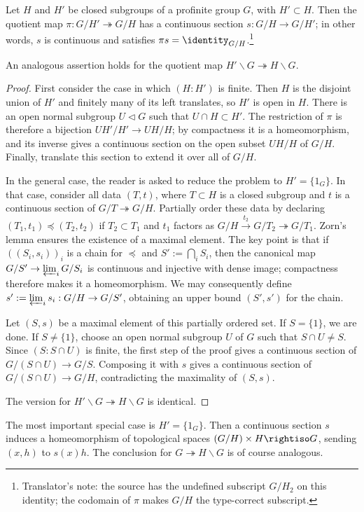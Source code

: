 \begin{lemma}\label{prop:profinite-section}
	Let $H$ and $H'$ be closed subgroups of a profinite group $G$, with $H'\subset H$. Then the quotient map $\pi:G/H'\twoheadrightarrow G/H$ has a continuous section $s:G/H\to G/H'$; in other words, $s$ is continuous and satisfies $\pi s=\identity_{G/H}$.\footnote{Translator's note: the source has the undefined subscript $G/H_2$ on this identity; the codomain of $\pi$ makes $G/H$ the type-correct subscript.}

	An analogous assertion holds for the quotient map
	$H'\backslash G\twoheadrightarrow H\backslash G$.
\end{lemma}
\begin{proof}
	First consider the case in which $(H:H')$ is finite. Then $H$ is the disjoint union of $H'$ and finitely many of its left translates, so $H'$ is open in $H$. There is an open normal subgroup $U\lhd G$ such that $U\cap H\subset H'$. The restriction of $\pi$ is therefore a bijection $UH'/H'\to UH/H$; by compactness it is a homeomorphism, and its inverse gives a continuous section on the open subset $UH/H$ of $G/H$. Finally, translate this section to extend it over all of $G/H$.

	In the general case, the reader is asked to reduce the problem to $H'=\{1_G\}$. In that case, consider all data $(T,t)$, where $T\subset H$ is a closed subgroup and $t$ is a continuous section of $G/T\twoheadrightarrow G/H$. Partially order these data by declaring $(T_1,t_1)\preceq(T_2,t_2)$ if $T_2\subset T_1$ and $t_1$ factors as
	$G/H\xrightarrow{t_2}G/T_2\twoheadrightarrow G/T_1$. Zorn's lemma ensures the existence of a maximal element. The key point is that if $((S_i,s_i))_i$ is a chain for $\preceq$ and $S':=\bigcap_iS_i$, then the canonical map
	$G/S'\to\varprojlim_iG/S_i$ is continuous and injective with dense image; compactness therefore makes it a homeomorphism. We may consequently define
	$s':=\varprojlim_i s_i:G/H\to G/S'$, obtaining an upper bound $(S',s')$ for the chain.

	Let $(S,s)$ be a maximal element of this partially ordered set. If $S=\{1\}$, we are done. If $S\neq\{1\}$, choose an open normal subgroup $U$ of $G$ such that $S\cap U\neq S$. Since $(S:S\cap U)$ is finite, the first step of the proof gives a continuous section of $G/(S\cap U)\to G/S$. Composing it with $s$ gives a continuous section of
	$G/(S\cap U)\to G/H$, contradicting the maximality of $(S,s)$.

	The version for $H'\backslash G\twoheadrightarrow H\backslash G$ is identical.
\end{proof}

The most important special case is $H'=\{1_G\}$. Then a continuous section $s$ induces a homeomorphism of topological spaces
$(G/H)\times H\rightiso G$, sending $(x,h)$ to $s(x)h$. The conclusion for $G\twoheadrightarrow H\backslash G$ is of course analogous.
